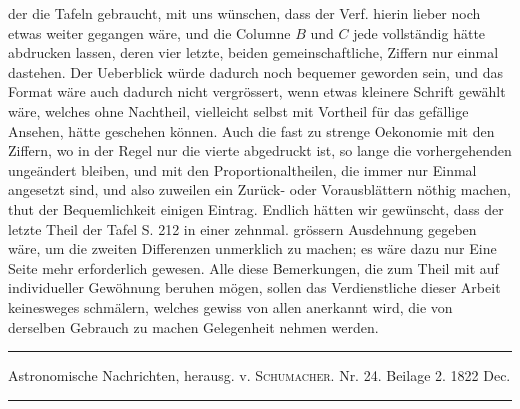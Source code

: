 der die Tafeln gebraucht, mit uns wünschen, dass der Verf. hierin lieber noch
etwas weiter gegangen wäre, und die Columne \(B\) und \(C\) jede vollständig hätte
abdrucken lassen, deren vier letzte, beiden gemeinschaftliche, Ziffern nur einmal
dastehen. Der Ueberblick würde dadurch noch bequemer geworden sein, und
das Format wäre auch dadurch nicht vergrössert, wenn etwas kleinere Schrift gewählt wäre, welches ohne Nachtheil, vielleicht selbst mit Vortheil für das gefällige Ansehen, hätte geschehen können. Auch die fast zu strenge Oekonomie mit
den Ziffern, wo in der Regel nur die vierte abgedruckt ist, so lange die vorhergehenden ungeändert bleiben, und mit den Proportionaltheilen, die immer nur
Einmal angesetzt sind, und also zuweilen ein Zurück- oder Vorausblättern nöthig
machen, thut der Bequemlichkeit einigen Eintrag. Endlich hätten wir gewünscht,
dass der letzte Theil der Tafel S. 212 in einer zehnmal. grössern Ausdehnung gegeben wäre, um die zweiten Differenzen unmerklich zu machen; es wäre dazu
nur Eine Seite mehr erforderlich gewesen. Alle diese Bemerkungen, die zum
Theil mit auf individueller Gewöhnung beruhen mögen, sollen das Verdienstliche
dieser Arbeit keinesweges schmälern, welches gewiss von allen anerkannt wird,
die von derselben Gebrauch zu machen Gelegenheit nehmen werden.

\par{}\begin{center}\rule{0.72\linewidth}{0.3pt}\par Astronomische Nachrichten, herausg. v. \textsc{Schumacher}. Nr. 24. Beilage 2. 1822 Dec.\par\rule{0.72\linewidth}{0.3pt}\end{center}

